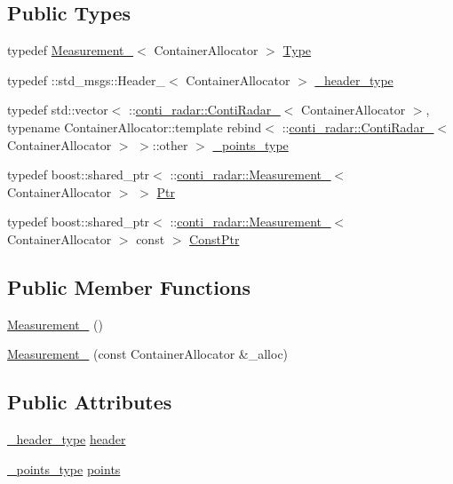 \subsection*{Public Types}
\begin{DoxyCompactItemize}
\item 
typedef \hyperlink{structconti__radar_1_1Measurement__}{Measurement\+\_\+}$<$ Container\+Allocator $>$ \hyperlink{structconti__radar_1_1Measurement___a2200a2a7e732e715ac1630d6a4dccdab}{Type}
\item 
typedef \+::std\+\_\+msgs\+::\+Header\+\_\+$<$ Container\+Allocator $>$ \hyperlink{structconti__radar_1_1Measurement___af08d17198291be87e84f45ef07e9155f}{\+\_\+header\+\_\+type}
\item 
typedef std\+::vector$<$ \+::\hyperlink{structconti__radar_1_1ContiRadar__}{conti\+\_\+radar\+::\+Conti\+Radar\+\_\+}$<$ Container\+Allocator $>$, typename Container\+Allocator\+::template rebind$<$ \+::\hyperlink{structconti__radar_1_1ContiRadar__}{conti\+\_\+radar\+::\+Conti\+Radar\+\_\+}$<$ Container\+Allocator $>$ $>$\+::other $>$ \hyperlink{structconti__radar_1_1Measurement___ad4384c3a255ac0bd1ba83addc0dafd71}{\+\_\+points\+\_\+type}
\item 
typedef boost\+::shared\+\_\+ptr$<$ \+::\hyperlink{structconti__radar_1_1Measurement__}{conti\+\_\+radar\+::\+Measurement\+\_\+}$<$ Container\+Allocator $>$ $>$ \hyperlink{structconti__radar_1_1Measurement___a581770a0ca6b1d82734898d07fd5cc6f}{Ptr}
\item 
typedef boost\+::shared\+\_\+ptr$<$ \+::\hyperlink{structconti__radar_1_1Measurement__}{conti\+\_\+radar\+::\+Measurement\+\_\+}$<$ Container\+Allocator $>$ const  $>$ \hyperlink{structconti__radar_1_1Measurement___af533b3149ee9f88e772d0080e08b0e43}{Const\+Ptr}
\end{DoxyCompactItemize}
\subsection*{Public Member Functions}
\begin{DoxyCompactItemize}
\item 
\hyperlink{structconti__radar_1_1Measurement___ae3409c1795ff01663ac93d3685718096}{Measurement\+\_\+} ()
\item 
\hyperlink{structconti__radar_1_1Measurement___a2dcfbe1222ec67ece03561b101705b66}{Measurement\+\_\+} (const Container\+Allocator \&\+\_\+alloc)
\end{DoxyCompactItemize}
\subsection*{Public Attributes}
\begin{DoxyCompactItemize}
\item 
\hyperlink{structconti__radar_1_1Measurement___af08d17198291be87e84f45ef07e9155f}{\+\_\+header\+\_\+type} \hyperlink{structconti__radar_1_1Measurement___afc62e4e451ea07e5726031459b10eda3}{header}
\item 
\hyperlink{structconti__radar_1_1Measurement___ad4384c3a255ac0bd1ba83addc0dafd71}{\+\_\+points\+\_\+type} \hyperlink{structconti__radar_1_1Measurement___a0a5cb134f81aef2032a39639e493ed25}{points}
\end{DoxyCompactItemize}



